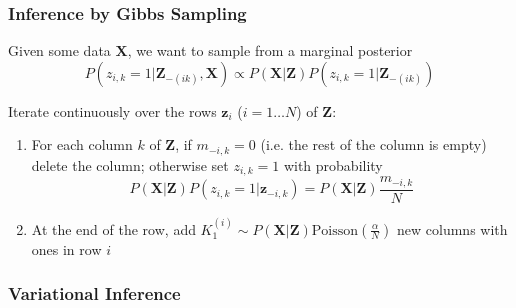 \documentclass[13pt]{beamer}
\begin{document}
\begin{frame}
\frametitle{Inference by Gibbs Sampling}
Given some data $\mathbf{X}$, we want to sample from a marginal posterior 
\[
    P(z_{i,k} = 1 | \mathbf{Z}_{-(ik)},\mathbf{X} ) \propto P(\mathbf{X}| \mathbf{Z}) P(z_{i,k} = 1 | \mathbf{Z}_{-(ik)} )
\]

Iterate continuously over the rows $\mathbf{z}_i$ ($i=1\ldots N$) of $\mathbf{Z}$:
\begin{enumerate}
    \item For each column $k$ of $\mathbf{Z}$, if $m_{-i,k} = 0$ (i.e. the rest of the column is empty) delete the column; 
        otherwise set $z_{i,k}=1$ with probability $$P(\mathbf{X}|\mathbf{Z}) P(z_{i,k}=1 | \mathbf{z}_{-i,k}) =  P(\mathbf{X}|\mathbf{Z})\frac{m_{-i,k}}{N}$$
    \item At the end of the row, add $K_1^{(i)} \sim P(\mathbf{X}|\mathbf{Z}) \text{Poisson}(\frac{\alpha}{N})$ new columns with ones in row $i$
\end{enumerate}

\end{frame}
\begin{frame}
\frametitle{Variational Inference}
\end{frame}
\end{document}
